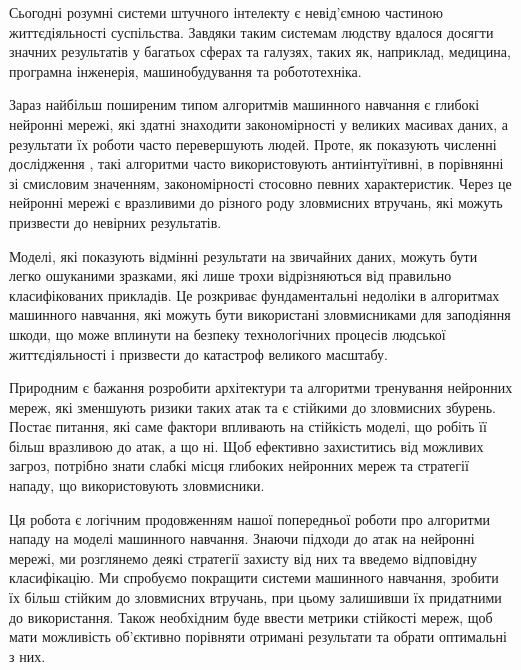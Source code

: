 \documentclass[14pt,a4paper]{extarticle}
\newcounter{e}
\numberwithin{equation}{section}
\numberwithin{figure}{section}
\begin{document}
Сьогодні розумні системи штучного інтелекту є невід'ємною частиною життєдіяльності суспільства. Завдяки таким системам людству вдалося досягти значних результатів у багатьох сферах та галузях, таких як, наприклад, медицина, програмна інженерія, машинобудування та робототехніка.

Зараз найбільш поширеним типом алгоритмів машинного навчання є глибокі нейронні мережі, які здатні знаходити закономірності у великих масивах даних, а результати їх роботи часто перевершують людей. Проте, як показують численні дослідження \cite{first-work}, такі алгоритми часто використовують антиінтуїтивні, в порівнянні зі смисловим значенням, закономірності стосовно певних характеристик. Через це нейронні мережі є вразливими до різного роду зловмисних втручань, які можуть призвести до невірних результатів.

Моделі, які показують відмінні результати на звичайних даних, можуть бути легко ошуканими зразками, які лише трохи відрізняються від правильно класифікованих прикладів. Це розкриває фундаментальні недоліки в алгоритмах машинного навчання, які можуть бути використані зловмисниками для заподіяння шкоди, що може вплинути на безпеку технологічних процесів людської життєдіяльності і призвести до катастроф великого масштабу.

Природним є бажання розробити архітектури та алгоритми тренування нейронних мереж, які зменшують ризики таких атак та є стійкими до зловмисних збурень. Постає питання, які саме фактори впливають на стійкість моделі, що робіть її більш вразливою до атак, а що ні. Щоб ефективно захиститись від можливих загроз, потрібно знати слабкі місця глибоких нейронних мереж та стратегії нападу, що використовують зловмисники.

Ця робота є логічним продовженням нашої попередньої роботи \cite{my-work} про алгоритми нападу на моделі машинного навчання. Знаючи підходи до атак на нейронні мережі, ми розглянемо деякі стратегії захисту від них та введемо відповідну класифікацію. Ми спробуємо покращити системи машинного навчання, зробити їх більш стійким до зловмисних втручань, при цьому залишивши їх придатними до використання. Також необхідним буде ввести метрики стійкості мереж, щоб мати можливість об'єктивно порівняти отримані результати та обрати оптимальні з них.

\end{document}
